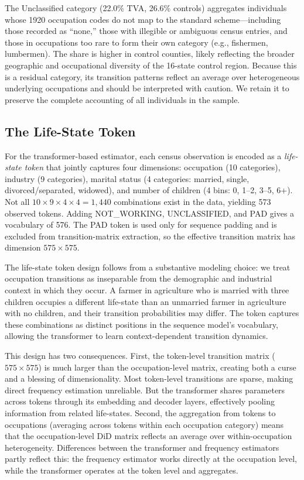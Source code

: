 \documentclass[12pt]{article}
\begin{document}
The Unclassified category (22.0\% TVA, 26.6\% controls) aggregates individuals whose 1920 occupation codes do not map to the standard scheme---including those recorded as ``none,'' those with illegible or ambiguous census entries, and those in occupations too rare to form their own category (e.g., fishermen, lumbermen). The share is higher in control counties, likely reflecting the broader geographic and occupational diversity of the 16-state control region. Because this is a residual category, its transition patterns reflect an average over heterogeneous underlying occupations and should be interpreted with caution. We retain it to preserve the complete accounting of all individuals in the sample.

\subsection{The Life-State Token}

For the transformer-based estimator, each census observation is encoded as a \textit{life-state token} that jointly captures four dimensions: occupation (10 categories), industry (9 categories), marital status (4 categories: married, single, divorced/separated, widowed), and number of children (4 bins: 0, 1--2, 3--5, 6+). Not all $10 \times 9 \times 4 \times 4 = 1{,}440$ combinations exist in the data, yielding 573 observed tokens. Adding NOT\_WORKING, UNCLASSIFIED, and PAD gives a vocabulary of 576. The PAD token is used only for sequence padding and is excluded from transition-matrix extraction, so the effective transition matrix has dimension $575 \times 575$.

The life-state token design follows from a substantive modeling choice: we treat occupation transitions as inseparable from the demographic and industrial context in which they occur. A farmer in agriculture who is married with three children occupies a different life-state than an unmarried farmer in agriculture with no children, and their transition probabilities may differ. The token captures these combinations as distinct positions in the sequence model's vocabulary, allowing the transformer to learn context-dependent transition dynamics.

This design has two consequences. First, the token-level transition matrix ($575 \times 575$) is much larger than the occupation-level matrix, creating both a curse and a blessing of dimensionality. Most token-level transitions are sparse, making direct frequency estimation unreliable. But the transformer shares parameters across tokens through its embedding and decoder layers, effectively pooling information from related life-states. Second, the aggregation from tokens to occupations (averaging across tokens within each occupation category) means that the occupation-level DiD matrix reflects an average over within-occupation heterogeneity. Differences between the transformer and frequency estimators partly reflect this: the frequency estimator works directly at the occupation level, while the transformer operates at the token level and aggregates.
\end{document}
